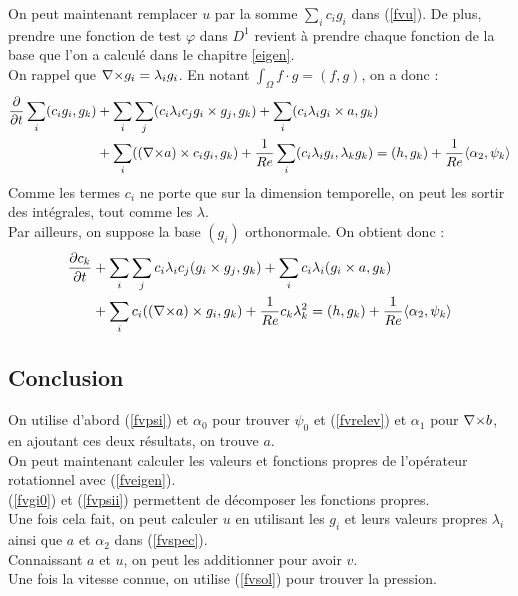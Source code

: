 On peut maintenant remplacer $u$ par la somme $\sum_ic_ig_i$ dans (\ref{fvu}). De plus, prendre une fonction de test $\varphi$ dans $D^1$ revient à prendre chaque fonction de la base que l'on a calculé dans le chapitre \ref{eigen}.\\
On rappel que ${\nabla\times} g_i=\lambda_ig_i$. En notant $\int_\Omega f\cdot g=(f,g)$, on a donc :
\begin{align*}
\frac{\partial}{\partial t}\sum_i (c_ig_i, g_k) &+ \sum_i\sum_j (c_i\lambda_ic_jg_i\times g_j,g_k) + \sum_i(c_i\lambda_ig_i\times a,g_k)\\
&+ \sum_i (({\nabla\times} a)\times c_ig_i,g_k) + \frac{1}{Re}\sum_i(c_i\lambda_ig_i, \lambda_kg_k) = (h,g_k) + \frac{1}{Re}\langle\alpha_2,\psi_k\rangle
\end{align*}
Comme les termes $c_i$ ne porte que sur la dimension temporelle, on peut les sortir des intégrales, tout comme les $\lambda$.\\
Par ailleurs, on suppose la base $(g_i)$ orthonormale. On obtient donc :
\begin{eqnarray}
\label{fvspec}
\begin{aligned}
\frac{\partial c_k}{\partial t} &+ \sum_i\sum_j c_i\lambda_i c_j(g_i\times g_j, g_k) + \sum_i c_i\lambda_i(g_i\times a,g_k)\\
&+ \sum_i c_i(({\nabla\times} a)\times g_i, g_k) + \frac{1}{Re}c_k\lambda_k^2 = (h,g_k) + \frac{1}{Re}\langle\alpha_2,\psi_k\rangle
\end{aligned}
\end{eqnarray}
 
\subsection{Conclusion}

On utilise d'abord (\ref{fvpsi}) et $\alpha_0$ pour trouver $\psi_0$ et (\ref{fvrelev}) et $\alpha_1$ pour ${\nabla\times} b$, en ajoutant ces deux résultats, on trouve $a$.\\
On peut maintenant calculer les valeurs et fonctions propres de l'opérateur rotationnel avec (\ref{fveigen}).\\
(\ref{fvgi0}) et (\ref{fvpsii}) permettent de décomposer les fonctions propres.\\
Une fois cela fait, on peut calculer $u$ en utilisant les $g_i$ et leurs valeurs propres $\lambda_i$ ainsi que $a$ et $\alpha_2$ dans (\ref{fvspec}).\\
Connaissant $a$ et $u$, on peut les additionner pour avoir $v$.\\
Une fois la vitesse connue, on utilise (\ref{fvsol}) pour trouver la pression. 

